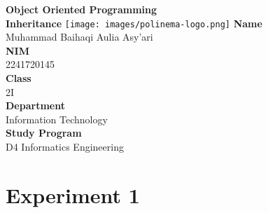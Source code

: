 \documentclass[12pt,titlepage]{article}
\newcommand{\vSubject}{Object Oriented Programming}
\newcommand{\vSubtitle}{Inheritance}
\newcommand{\vName}{Muhammad Baihaqi Aulia Asy'ari}
\newcommand{\vNIM}{2241720145}
\newcommand{\vClass}{2I}
\newcommand{\vDepartment}{Information Technology}
\newcommand{\vStudyProgram}{D4 Informatics Engineering}
\begin{document}
\begin{titlepage}
    \centering
    \vfill
    {\bfseries\LARGE
        \vSubject\\
        \vskip0.25cm
        \vSubtitle
    }
    \vfill
    \texttt{[image: images/polinema-logo.png]}
    \vfill
    {
        \textbf{Name}\\
        \vName\\
        \vskip0.5cm
        \textbf{NIM}\\
        \vNIM\\
        \vskip0.5cm
        \textbf{Class}\\
        \vClass\\
        \vskip0.5cm
        \textbf{Department}\\
        \vDepartment\\
        \vskip0.5cm
        \textbf{Study Program}\\
        \vStudyProgram
    }
\end{titlepage}

\newpage

\section{Experiment 1}
\end{document}

